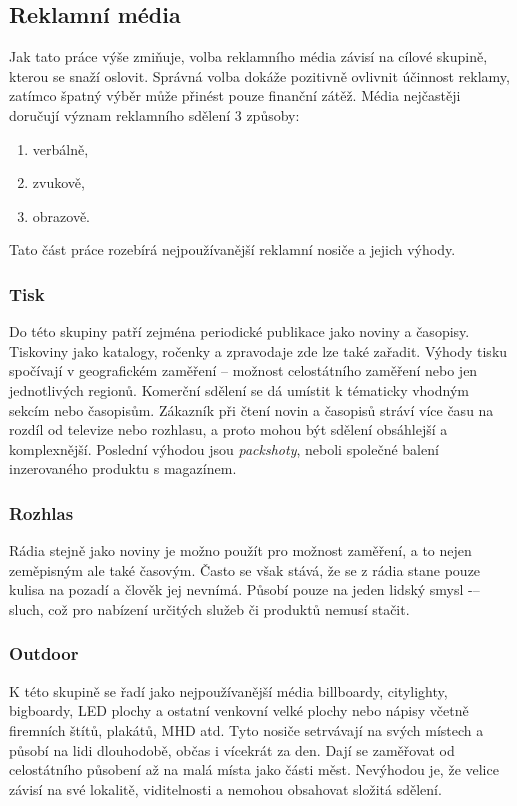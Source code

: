     \subsection{Reklamní média}
    Jak tato práce výše zmiňuje, volba reklamního média závisí na cílové skupině, kterou se snaží oslovit.
    Správná volba dokáže pozitivně ovlivnit účinnost reklamy, zatímco špatný výběr může přinést pouze finanční zátěž.
    Média nejčastěji doručují význam reklamního sdělení 3 způsoby:
    \begin{enumerate}
        \item verbálně,
        \item zvukově,
        \item obrazově.
    \end{enumerate}
    Tato část práce rozebírá nejpoužívanější reklamní nosiče a jejich výhody. \cite{typy:medii} \cite{typy:mediatypy}
    
    \subsubsection{Tisk}
    Do této skupiny patří zejména periodické publikace jako noviny a časopisy. Tiskoviny jako katalogy, ročenky a zpravodaje zde lze také zařadit.
    Výhody tisku spočívají v geografickém zaměření -- možnost celostátního zaměření nebo jen jednotlivých regionů. Komerční sdělení se dá umístit k tématicky
    vhodným sekcím nebo časopisům. Zákazník při čtení novin a časopisů stráví více času na rozdíl od televize nebo rozhlasu,
    a proto mohou být sdělení obsáhlejší a komplexnější. Poslední výhodou jsou \emph{packshoty}, neboli společné balení inzerovaného produktu s magazínem.
    
    \subsubsection{Rozhlas}
    Rádia stejně jako noviny je možno použít pro možnost zaměření, a to nejen zeměpisným ale také časovým. Často se však stává,
    že se z rádia stane pouze kulisa na pozadí a člověk jej nevnímá. Působí pouze na jeden lidský smysl -– sluch,
    což pro nabízení určitých služeb či produktů nemusí stačit.

    \subsubsection{Outdoor}
    K této skupině se řadí jako nejpoužívanější média billboardy, citylighty, bigboardy, LED plochy a ostatní venkovní velké plochy nebo nápisy včetně
    firemních štítů, plakátů, MHD atd. Tyto nosiče setrvávají na svých místech a působí na lidi dlouhodobě, občas i vícekrát za den.
    Dají se zaměřovat od celostátního působení až na malá místa jako části měst. Nevýhodou je, že velice závisí na své lokalitě, viditelnosti a
    nemohou obsahovat složitá sdělení. 


